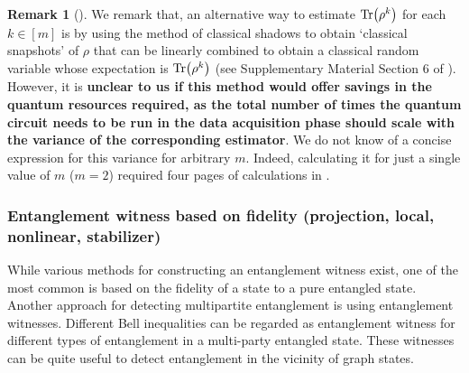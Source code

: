 \documentclass[
aps,
pra,
floatfix,
]{revtex4-2}
\theoremstyle{plain}
\theoremstyle{definition}
\newtheorem{remark}{Remark}
\newcommand{\dm}{\rho}
\begin{document}
\begin{remark}[\cite{quekMultivariateTraceEstimation2022}]
	We remark that, an alternative way to estimate $\Tr( \dm^k )$ for each $k \in [m]$ is by using the method of classical shadows to obtain `classical snapshots' of $\dm$ that can be linearly combined to obtain a classical random variable whose expectation is $\Tr( \dm^k )$ (see Supplementary Material Section 6 of \cite{huangPredictingManyProperties2020}). 
	However, it is \textbf{unclear to us if this method would offer savings in the quantum resources required, as the total number of times the quantum circuit needs to be run in the data acquisition phase should scale with the variance of the corresponding estimator}. 
	We do not know of a concise expression for this variance for arbitrary $m$. Indeed, calculating it for just a single value of $m$ ($m = 2$) required four pages of calculations in \cite{huangPredictingManyProperties2020}.
\end{remark}


\subsubsection{Entanglement witness based on fidelity (projection, local, nonlinear, stabilizer)}\label{sec:entanglement_witness}
While various methods for constructing an entanglement witness exist, one of the most common is based on the ﬁdelity of a state to a pure entangled state.
Another approach for detecting multipartite entanglement is using entanglement witnesses.
Different Bell inequalities can be regarded as entanglement witness for different types of entanglement in a multi-party entangled state.
These witnesses can be quite useful to detect entanglement in the vicinity of graph states.

\end{document}
